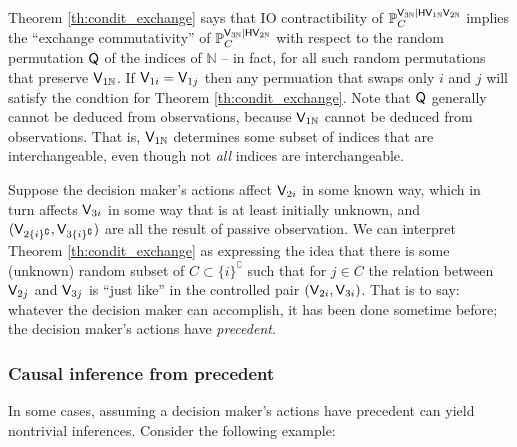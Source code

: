 Theorem \ref{th:condit_exchange} says that IO contractibility of $\mathbb{P}_C^{\mathsf{V}_{3\mathbb{N}}|\mathsf{H}\mathsf{V}_{1\mathbb{N}}\mathsf{V}_{2\mathbb{N}}}$ implies the ``exchange commutativity'' of $\mathbb{P}_C^{\mathsf{V}_{3\mathbb{N}}|\mathsf{H}\mathsf{V}_{2\mathbb{N}}}$ with respect to the random permutation $\mathsf{Q}$ of the indices of $\mathbb{N}$ -- in fact, for all such random permutations that preserve $\mathsf{V}_{1\mathbb{N}}$. If $\mathsf{V}_{1i}=\mathsf{V}_{1j}$ then any permuation that swaps only $i$ and $j$ will satisfy the condtion for Theorem \ref{th:condit_exchange}. Note that $\mathsf{Q}$ generally cannot be deduced from observations, because $\mathsf{V}_{1\mathbb{N}}$ cannot be deduced from observations. That is, $\mathsf{V}_{1\mathbb{N}}$ determines some subset of indices that are interchangeable, even though not \emph{all} indices are interchangeable. 

Suppose the decision maker's actions affect $\mathsf{V}_{2i}$ in some known way, which in turn affects $\mathsf{V}_{3i}$ in some way that is at least initially unknown, and $(\mathsf{V}_{2\{i\}^\complement},\mathsf{V}_{3\{i\}^\complement})$ are all the result of passive observation. We can interpret Theorem \ref{th:condit_exchange} as expressing the idea that there is some (unknown) random subset of $C\subset \{i\}^\complement$ such that for $j\in C$ the relation between $\mathsf{V}_{2j}$ and $\mathsf{V}_{3j}$ is ``just like'' in the controlled pair $(\mathsf{V}_{2i},\mathsf{V}_{3i})$. That is to say: whatever the decision maker can accomplish, it has been done sometime before; the decision maker's actions have \emph{precedent}.

\subsubsection{Causal inference from precedent}

In some cases, assuming a decision maker's actions have precedent can yield nontrivial inferences. Consider the following example:

